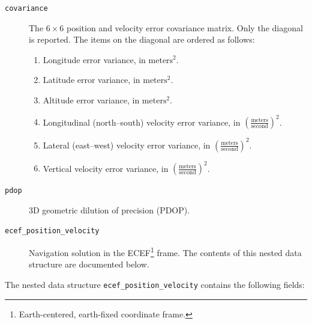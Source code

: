 \documentclass{zubaxdoc}
\begin{document}
\begin{description}
    \item[\texttt{covariance}] The $6\times6$ position and velocity error covariance matrix.
    Only the diagonal is reported. The items on the diagonal are ordered as follows:
    \begin{enumerate}
        \item Longitude error variance, in $\text{meters}^2$.
        \item Latitude error variance, in $\text{meters}^2$.
        \item Altitude error variance, in $\text{meters}^2$.
        \item Longitudinal (north--south) velocity error variance,
              in $\left(\frac{\text{meters}}{\text{second}}\right)^2$.
        \item Lateral (east--west) velocity error variance,
              in $\left(\frac{\text{meters}}{\text{second}}\right)^2$.
        \item Vertical velocity error variance, in $\left(\frac{\text{meters}}{\text{second}}\right)^2$.
    \end{enumerate}
    
    \item[\texttt{pdop}] 3D geometric dilution of precision (PDOP).
    
    \item[\texttt{ecef\_position\_velocity}] Navigation solution in the
    ECEF\footnote{Earth-centered, earth-fixed coordinate frame.} frame.
    The contents of this nested data structure are documented below.
\end{description}

The nested data structure \verb|ecef_position_velocity| contains the following fields:
\end{document}
